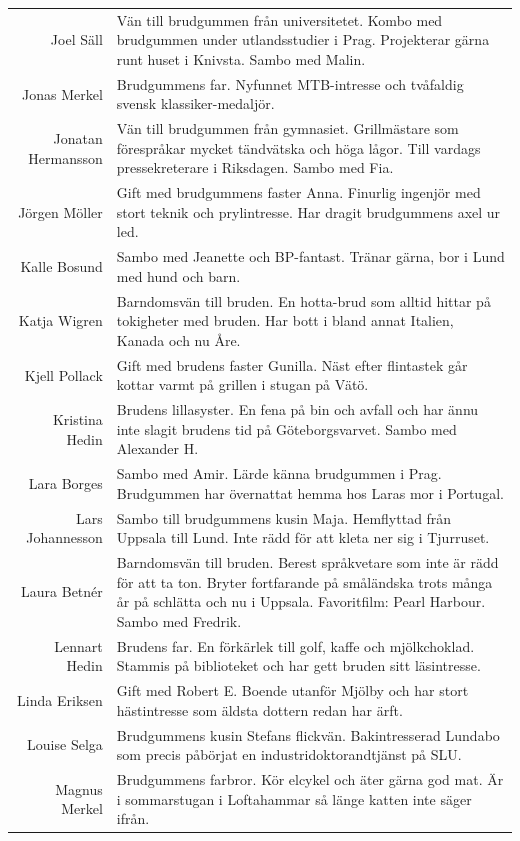 \documentclass[a5paper]{article}
\begin{document}
\begin{longtable}[l]{N|L}
				Joel Säll	&	Vän till brudgummen från universitetet. Kombo med brudgummen under utlandsstudier i Prag. Projekterar gärna runt huset i Knivsta. Sambo med Malin.	\\
				Jonas Merkel	&	Brudgummens far. Nyfunnet MTB-intresse och tvåfaldig svensk klassiker-medaljör.	\\
				Jonatan Hermansson	&	Vän till brudgummen från gymnasiet. Grillmästare som förespråkar mycket tändvätska och höga lågor. Till vardags pressekreterare i Riksdagen. Sambo med Fia.	\\
				Jörgen Möller	&	Gift med brudgummens faster Anna. Finurlig ingenjör med stort teknik och prylintresse. Har dragit brudgummens axel ur led.	\\
				Kalle Bosund	&	Sambo med Jeanette och BP-fantast. Tränar gärna, bor i Lund med hund och barn.	\\
				Katja Wigren	&	Barndomsvän till bruden. En hotta-brud som alltid hittar på tokigheter med bruden. Har bott i bland annat Italien, Kanada och nu Åre.	\\
				Kjell Pollack	&	Gift med brudens faster Gunilla. Näst efter flintastek går kottar varmt på grillen i stugan på Vätö.	\\
				Kristina Hedin	&	Brudens lillasyster. En fena på bin och avfall och har ännu inte slagit brudens tid på Göteborgsvarvet. Sambo med Alexander H.	\\
				Lara Borges	&	Sambo med Amir. Lärde känna brudgummen i Prag. Brudgummen har övernattat hemma hos Laras mor i Portugal.	\\
				Lars Johannesson	&	Sambo till brudgummens kusin Maja. Hemflyttad från Uppsala till Lund. Inte rädd för att kleta ner sig i Tjurruset.	\\
				Laura Betnér	&	Barndomsvän till bruden. Berest språkvetare som inte är rädd för att ta ton. Bryter fortfarande på småländska trots många år på schlätta och nu i Uppsala. Favoritfilm: Pearl Harbour. Sambo med Fredrik.	\\
				Lennart Hedin	&	Brudens far. En förkärlek till golf, kaffe och mjölkchoklad. Stammis på biblioteket och har gett bruden sitt läsintresse.	\\
				Linda Eriksen	&	Gift med Robert E. Boende utanför Mjölby och har stort hästintresse som äldsta dottern redan har ärft.	\\
				Louise Selga	&	Brudgummens kusin Stefans flickvän. Bakintresserad Lundabo som precis påbörjat en industridoktorandtjänst på SLU. 	\\
				Magnus Merkel	&	Brudgummens farbror. Kör elcykel och äter gärna god mat. Är i sommarstugan i Loftahammar så länge katten inte säger ifrån.	\\

\end{longtable}
\end{document}
